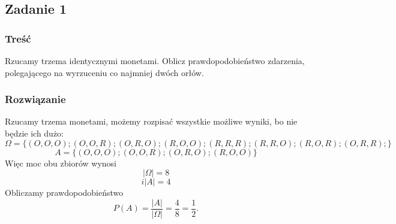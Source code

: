 \subsection{Zadanie 1}

\subsubsection*{Treść}
Rzucamy trzema identycznymi monetami. Oblicz prawdopodobieństwo zdarzenia, polegającego na wyrzuceniu co najmniej dwóch orłów.

\subsubsection*{Rozwiązanie}
Rzucamy trzema monetami, możemy rozpisać wszystkie możliwe wyniki, bo nie będzie ich dużo:
$$
\Omega=\{ (O,O,O); (O,O,R); (O,R,O); (R,O,O); (R,R,R); (R,R,O); (R,O,R); (O,R,R);\}
$$
$$
A=\{ (O,O,O); (O,O,R); (O,R,O); (R,O,O)\}
$$
Więc moc obu zbiorów wynosi
$$
|\Omega|=8
$$
$$
i|A|=4
$$
Obliczamy prawdopodobieństwo 
$$
P(A)=\frac{|A|}{|\Omega|}=\frac{4}{8}=\frac{1}{2}.
$$

